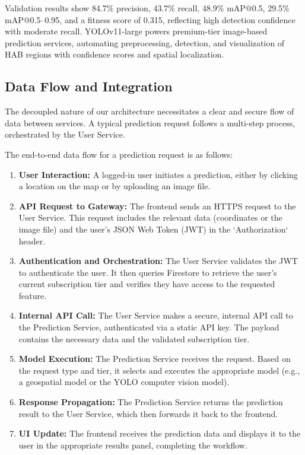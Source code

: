 \documentclass[conference]{IEEEtran}
\begin{document}
Validation results show 84.7\% precision, 43.7\% recall, 48.9\% mAP@0.5, 29.5\% mAP@0.5--0.95, and a fitness score of 0.315, reflecting high detection confidence with moderate recall. YOLOv11-large powers premium-tier image-based prediction services, automating preprocessing, detection, and visualization of HAB regions with confidence scores and spatial localization.

\subsection{Data Flow and Integration}

The decoupled nature of our architecture necessitates a clear and secure flow of data between services. A typical prediction request follows a multi-step process, orchestrated by the User Service.

The end-to-end data flow for a prediction request is as follows:
\begin{enumerate}
    \item \textbf{User Interaction:} A logged-in user initiates a prediction, either by clicking a location on the map or by uploading an image file.
    \item \textbf{API Request to Gateway:} The frontend sends an HTTPS request to the User Service. This request includes the relevant data (coordinates or the image file) and the user's JSON Web Token (JWT) in the `Authorization` header.
    \item \textbf{Authentication and Orchestration:} The User Service validates the JWT to authenticate the user. It then queries Firestore to retrieve the user's current subscription tier and verifies they have access to the requested feature.
    \item \textbf{Internal API Call:} The User Service makes a secure, internal API call to the Prediction Service, authenticated via a static API key. The payload contains the necessary data and the validated subscription tier.
    \item \textbf{Model Execution:} The Prediction Service receives the request. Based on the request type and tier, it selects and executes the appropriate model (e.g., a geospatial model or the YOLO computer vision model).
    \item \textbf{Response Propagation:} The Prediction Service returns the prediction result to the User Service, which then forwards it back to the frontend.
    \item \textbf{UI Update:} The frontend receives the prediction data and displays it to the user in the appropriate results panel, completing the workflow.
\end{enumerate}
\end{document}
